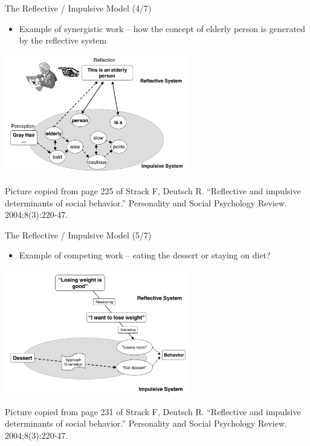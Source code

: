 \documentclass{beamer}
\begin{document}
\begin{frame}
{\centerline{The Reflective / Impulsive Model (4/7)}}
\begin{itemize}
    \item Example of synergistic work -- how the concept of elderly person is generated by the reflective system
\end{itemize} 

\begin{center}

 \includegraphics[width=8cm]{P2023.AIBCCSS.KnowledgeAcquisitionRetentionUse/RI.IdentifyingElderly.Reflective.jpg}
 
 \end{center}


\begin{center}
    \tiny{Picture copied from page 225 of Strack F, Deutsch R. ``Reflective and impulsive determinants of social behavior.'' Personality and Social Psychology Review. 2004;8(3):220-47.}
    \end{center}

\end{frame}

\begin{frame}
{\centerline{The Reflective / Impulsive Model (5/7)}}
\begin{itemize}
    \item Example of competing work -- eating the dessert or staying on diet?
\end{itemize} 

\begin{center}

 \includegraphics[width=8cm]{P2023.AIBCCSS.KnowledgeAcquisitionRetentionUse/RI.Competing.jpg}
 
 \end{center}


\begin{center}
    \tiny{Picture copied from page 231 of Strack F, Deutsch R. ``Reflective and impulsive determinants of social behavior.'' Personality and Social Psychology Review. 2004;8(3):220-47.}
    \end{center}

\end{frame}
\end{document}

